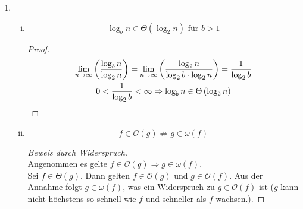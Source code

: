 \documentclass[a4paper]{scrartcl}
\begin{document}
\begin{enumerate}
\begin{enumerate}[i.]
        \end{enumerate}

        \item
            \begin{enumerate}[(i)]
                \item
                    \begin{behaupt}
                        \begin{equation*}
                            \log_b n \in \Theta \left( \log_2 n \right) \text{ für } b > 1
                        \end{equation*}
                    \end{behaupt}
                    \begin{proof}
                        \begin{equation*}
                            \begin{gathered}
                                \lim_{n \to \infty} \left( \frac{\log_b n}{\log_2 n} \right)
                                = \lim_{n \to \infty} \left( \frac{\log_2 n}{\log_2 b \cdot \log_2 n} \right)
                                = \frac{1}{\log_2 b} \\
                                0 < \frac{1}{\log_2 b} < \infty
                                \Rightarrow \log_b n \in \Theta \left( \log_2 n \right)
                            \end{gathered}
                        \end{equation*}
                    \end{proof}

                \item
                    \begin{behaupt}
                        \begin{equation}
                            f \in \mathcal{O}(g) \not\Rightarrow g \in \omega(f)
                        \end{equation}
                    \end{behaupt}
                    \begin{proof}[Beweis durch Widerspruch] \hfill \\
                        Angenommen es gelte $f \in \mathcal{O}(g) \Rightarrow g \in \omega(f)$. \\
                        Sei $f \in \Theta(g)$.
                        Dann gelten $f \in \mathcal{O}(g)$ und $g \in \mathcal{O}(f)$.
                        Aus der Annahme folgt $g \in \omega(f)$, was ein
                        Widerspruch zu $g \in \mathcal{O}(f)$ ist
                        ($g$ kann nicht höchstens so schnell wie $f$ und schneller
                        als $f$ wachsen.).
                    \end{proof}


\end{enumerate}
\end{enumerate}
\end{document}

